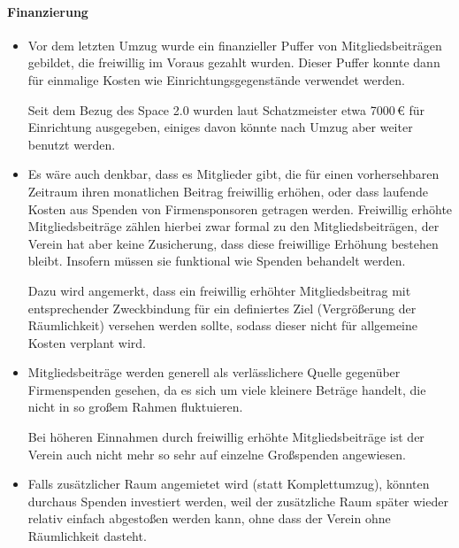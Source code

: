 \documentclass{s0minutes}
\begin{document}
\paragraph{Finanzierung}
\begin{itemize}
  \item Vor dem letzten Umzug wurde ein finanzieller Puffer von
    Mitgliedsbeiträgen gebildet, die freiwillig im Voraus gezahlt wurden. Dieser
    Puffer konnte dann für einmalige Kosten wie Einrichtungsgegenstände
    verwendet werden.

    Seit dem Bezug des Space 2.0 wurden laut Schatzmeister etwa 7000\,€ für
    Einrichtung ausgegeben, einiges davon könnte nach Umzug aber weiter benutzt
    werden.

  \item Es wäre auch denkbar, dass es Mitglieder gibt, die für einen
    vorhersehbaren Zeitraum ihren monatlichen Beitrag freiwillig erhöhen, oder
    dass laufende Kosten aus Spenden von Firmensponsoren getragen werden.
    Freiwillig erhöhte Mitgliedsbeiträge zählen hierbei zwar formal zu den
    Mitgliedsbeiträgen, der Verein hat aber keine Zusicherung, dass diese
    freiwillige Erhöhung bestehen bleibt. Insofern müssen sie funktional wie
    Spenden behandelt werden.

    Dazu wird angemerkt, dass ein freiwillig erhöhter Mitgliedsbeitrag mit
    entsprechender Zweckbindung für ein definiertes Ziel (Vergrößerung der
    Räumlichkeit) versehen werden sollte, sodass dieser nicht für
    allgemeine Kosten verplant wird.

  \item Mitgliedsbeiträge werden generell als verlässlichere Quelle gegenüber
    Firmenspenden gesehen, da es sich um viele kleinere Beträge handelt, die
    nicht in so großem Rahmen fluktuieren.

    Bei höheren Einnahmen durch freiwillig erhöhte Mitgliedsbeiträge ist
    der Verein auch nicht mehr so sehr auf einzelne Großspenden angewiesen.

  \item Falls zusätzlicher Raum angemietet wird (statt Komplettumzug),
    könnten durchaus Spenden investiert werden, weil der zusätzliche Raum
    später wieder relativ einfach abgestoßen werden kann, ohne dass der Verein
    ohne Räumlichkeit dasteht.
\end{itemize}
\end{document}

